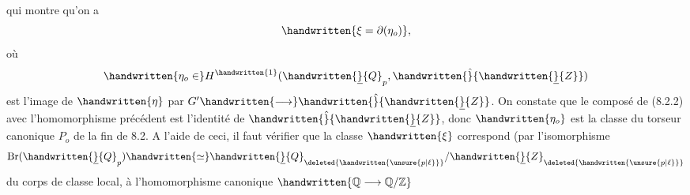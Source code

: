 qui montre qu'on  a
\[
\handwritten{\xi=\partial(\eta_o)},
\]
où
\[
\handwritten{\eta_o\in}H^{\handwritten{1}}(\handwritten{\underline}{Q}_p,\handwritten{\hat}{\handwritten{\underline}{Z}})
\]
est l'image de $\handwritten{\eta}$ par $G'\handwritten{\longrightarrow}\handwritten{\hat}{\handwritten{\underline}{Z}}$. On constate que le composé de (8.2.2) avec l'homomorphisme précédent est l'identité de $\handwritten{\hat}{\handwritten{\underline}{Z}}$, donc $\handwritten{\eta_o}$ est la classe du torseur canonique $P_o$ de la fin de 8.2. A l'aide de ceci, il faut vérifier que la classe $\handwritten{\xi}$ correspond (par l'isomorphisme
\[
\operatorname{Br}(\handwritten{\underline}{Q}_p)\handwritten{\simeq}\handwritten{\underline}{Q}_{\deleted{\handwritten{\unsure{p|\ell}}}}/\handwritten{\underline}{Z}_{\deleted{\handwritten{\unsure{p|\ell}}}}
\]
du corps de classe local, à l'homomorphisme canonique $\handwritten{\mathbb{Q}\longrightarrow\mathbb{Q}/\mathbb{Z}}$
